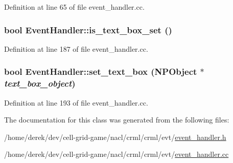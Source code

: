 Definition at line 65 of file event\_\-handler.cc.

\hypertarget{class_event_handler_a2f334e3eb39be72751e342619489e695}{
\subsubsection[{is\_\-text\_\-box\_\-set}]{\setlength{\rightskip}{0pt plus 5cm}bool EventHandler::is\_\-text\_\-box\_\-set ()}}
\label{class_event_handler_a2f334e3eb39be72751e342619489e695}


Definition at line 187 of file event\_\-handler.cc.

\hypertarget{class_event_handler_aa09c0b995aa6c774d4a33be13be0cbf2}{
\subsubsection[{set\_\-text\_\-box}]{\setlength{\rightskip}{0pt plus 5cm}bool EventHandler::set\_\-text\_\-box (NPObject $\ast$ {\em text\_\-box\_\-object})}}
\label{class_event_handler_aa09c0b995aa6c774d4a33be13be0cbf2}


Definition at line 193 of file event\_\-handler.cc.



The documentation for this class was generated from the following files:\begin{DoxyCompactItemize}
\item 
/home/derek/dev/cell-\/grid-\/game/nacl/crml/crml/evt/\hyperlink{event__handler_8h}{event\_\-handler.h}\item 
/home/derek/dev/cell-\/grid-\/game/nacl/crml/crml/evt/\hyperlink{event__handler_8cc}{event\_\-handler.cc}\end{DoxyCompactItemize}
